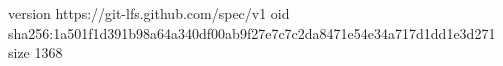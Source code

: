 version https://git-lfs.github.com/spec/v1
oid sha256:1a501f1d391b98a64a340df00ab9f27e7c7c2da8471e54e34a717d1dd1e3d271
size 1368
